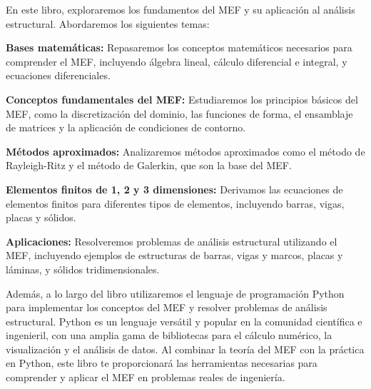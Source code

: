 En este libro, exploraremos los fundamentos del MEF y su aplicación al análisis estructural.  Abordaremos los siguientes temas:

\textbf{Bases matemáticas:} Repasaremos los conceptos matemáticos necesarios para comprender el MEF, incluyendo álgebra lineal, cálculo diferencial e integral, y ecuaciones diferenciales.

\textbf{Conceptos fundamentales del MEF:}  Estudiaremos los principios básicos del MEF, como la discretización del dominio, las funciones de forma, el ensamblaje de matrices y la aplicación de condiciones de contorno.

\textbf{Métodos aproximados:}  Analizaremos métodos aproximados como el método de Rayleigh-Ritz y el método de Galerkin, que son la base del MEF.

\textbf{Elementos finitos de 1, 2 y 3 dimensiones:}  Derivamos las ecuaciones de elementos finitos para diferentes tipos de elementos, incluyendo barras, vigas, placas y sólidos.

\textbf{Aplicaciones:} Resolveremos problemas de análisis estructural utilizando el MEF, incluyendo ejemplos de estructuras de barras, vigas y marcos, placas y láminas, y sólidos tridimensionales.
	
Además, a lo largo del libro utilizaremos el lenguaje de programación Python para implementar los conceptos del MEF y resolver problemas de análisis estructural.  Python es un lenguaje versátil y popular en la comunidad científica e ingenieril, con una amplia gama de bibliotecas para el cálculo numérico, la visualización y el análisis de datos.  Al combinar la teoría del MEF con la práctica en Python, este libro te proporcionará las herramientas necesarias para comprender y aplicar el MEF en problemas reales de ingeniería.